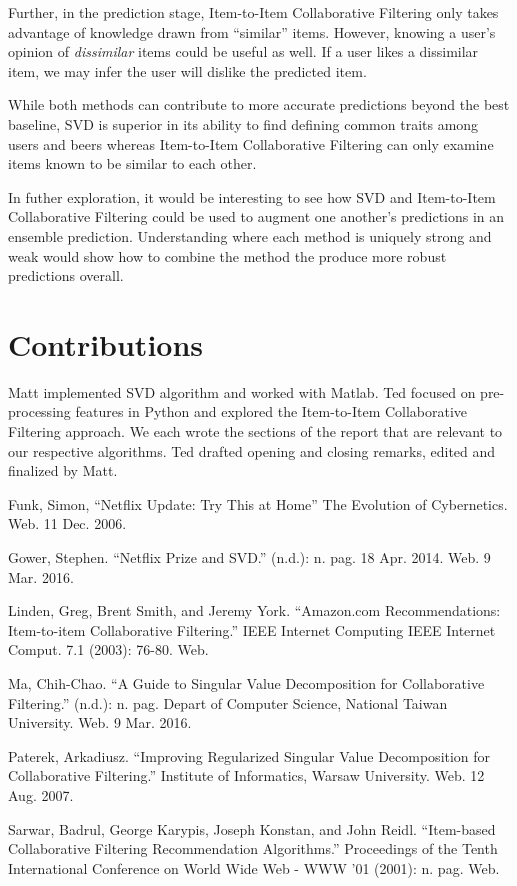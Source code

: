 \documentclass[12pt]{article}
\begin{document}
Further, in the prediction stage, Item-to-Item Collaborative Filtering only takes advantage of knowledge drawn from ``similar'' items. However, knowing a user's opinion of \textit{dissimilar} items could be useful as well. If a user likes a dissimilar item, we may infer the user will dislike the predicted item.

While both methods can contribute to more accurate predictions beyond the best baseline, SVD is superior in its ability to find defining common traits among users and beers whereas Item-to-Item Collaborative Filtering can only examine items known to be similar to each other.

In futher exploration, it would be interesting to see how SVD and Item-to-Item Collaborative Filtering could be used to augment one another's predictions in an ensemble prediction. Understanding where each method is uniquely strong and weak would show how to combine the method the produce more robust predictions overall.

\section{Contributions}
Matt implemented SVD algorithm and worked with Matlab. Ted focused on pre-processing features in Python and explored the Item-to-Item Collaborative Filtering approach. We each wrote the sections of the report that are relevant to our respective algorithms. Ted drafted opening and closing remarks, edited and finalized by Matt.

\newpage
\begin{thebibliography}{9}

Funk, Simon, ``Netflix Update: Try This at Home'' The Evolution of Cybernetics. Web. 11 Dec. 2006.

Gower, Stephen. ``Netflix Prize and SVD.'' (n.d.): n. pag. 18 Apr. 2014. Web. 9 Mar. 2016.

Linden, Greg, Brent Smith, and Jeremy York. ``Amazon.com Recommendations: Item-to-item Collaborative Filtering.'' IEEE Internet Computing IEEE Internet Comput. 7.1 (2003): 76-80. Web.

Ma, Chih-Chao. ``A Guide to Singular Value Decomposition for Collaborative Filtering.'' (n.d.): n. pag. Depart of Computer Science, National Taiwan University. Web. 9 Mar. 2016.

Paterek, Arkadiusz. ``Improving Regularized Singular Value Decomposition for Collaborative Filtering.'' Institute of Informatics, Warsaw University. Web. 12 Aug. 2007.

Sarwar, Badrul, George Karypis, Joseph Konstan, and John Reidl. ``Item-based Collaborative Filtering Recommendation Algorithms.'' Proceedings of the Tenth International Conference on World Wide Web - WWW '01 (2001): n. pag. Web.

\end{thebibliography}
\end{document}
